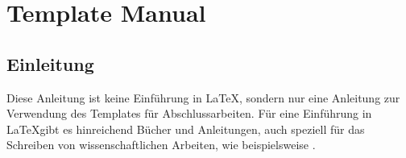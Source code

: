 %


\chapter{Template Manual}


\section{Einleitung}
Diese Anleitung ist keine Einführung in \LaTeX, sondern nur eine Anleitung zur Verwendung des Templates für Abschlussarbeiten. Für eine Einführung in \LaTeX gibt es hinreichend Bücher und Anleitungen, auch speziell für das Schreiben von wissenschaftlichen Arbeiten, wie beispielsweise \citep{schlosser2016wissenschaftliche}.
